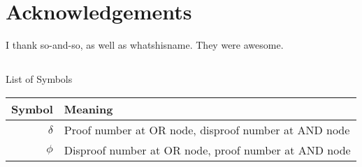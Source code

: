 \documentclass[12pt, letterpaper]{report}
\numberwithin{equation}{section}
\begin{document}

	\newpage 
 	\chapter*{Acknowledgements}
 	\thispagestyle{empty}
 	\vspace*{-0.7in}
 	\small{
	I thank so-and-so, as well as whatshisname. They were awesome.
	}
	
	\newpage
	\normalsize
	\tableofcontents 
	
	\newpage
	\listoffigures

	\newpage	
	\listoftables
	
	\newpage
	\thispagestyle{empty}
	\section*{}
	\begin{flushright}
		\huge{List of Symbols}
	\end{flushright}
	\vspace{0.4in}
	\begin{center}
		\begin{tabular}{rl}
			Symbol & Meaning\\
			\hline
			$\delta$ 			& Proof number at OR node, disproof number at AND node \\
			$\phi$ 				& Disproof number at OR node, proof number at AND node \\
		\end{tabular}
	\end{center}
	
	\newpage
	\thispagestyle{empty}
\end{document}
